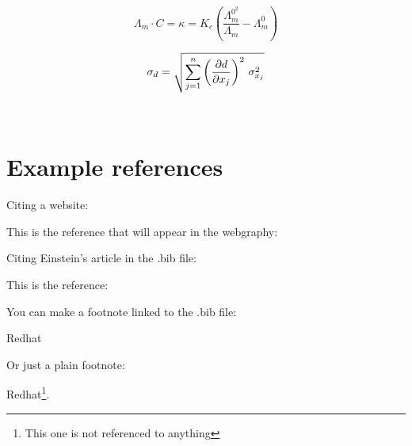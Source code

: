 \documentclass[a4paper,twoside,11pt]{article}
\begin{document}
\begin{equation}
\Lambda_{m} \cdot C = \kappa = K_{c}\left( \frac{\Lambda_{m}^{0^2}}{\Lambda_{m}}-\Lambda_{m}^{0}\right)
\end{equation}

\begin{equation}
\sigma_{d}=\sqrt{\sum \limits_{j=1}^n \left(\frac{\partial d}{\partial x_j}\right)^{2}\,\sigma^{2}_{x_j}}\\[0.5cm]
\end{equation}

\\



\newpage
\section{Example references}
Citing a website:

\begin{center}
    This is the reference that will appear in the webgraphy: \cite{windows}
\end{center}

Citing Einstein's article in the .bib file:

\begin{center}
    This is the reference: \cite{einstein}
\end{center}

You can make a footnote linked to the .bib file:
\begin{center}
    Redhat \autocite{redhat}
\end{center}
Or just a plain footnote:
\begin{center}
    Redhat\footnote{This one is not referenced to anything}.
\end{center}

\newpage



\printbibliography[heading=bibintoc,title={Referencias}]
\printbibliography[heading=subbibintoc,type=online,title={Webgrafía}]
\printbibliography[heading=subbibintoc,type=article,title={Artículos}]
\end{document}
